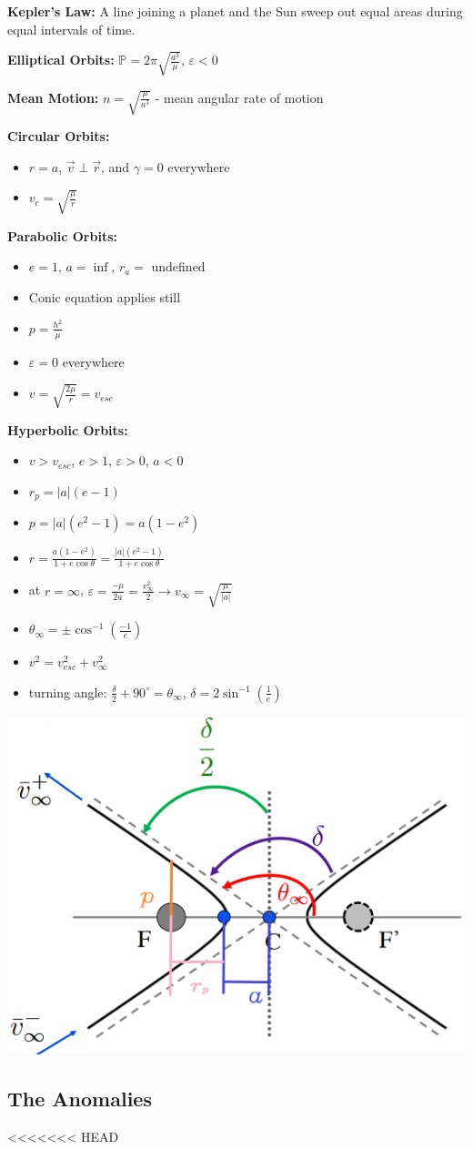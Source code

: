 \documentclass{article}
\begin{document}
\begin{multicols*}{3}
    \textbf{Kepler's Law:} A line joining a planet and the Sun sweep out equal areas during equal intervals of time.\par 
    \textbf{Elliptical Orbits:} $\mathbb{P}=2\pi\sqrt{\frac{a^3}{\mu}}$, $\varepsilon<0$\par
    \textbf{Mean Motion:} $n=\sqrt{\frac{\mu}{a^3}}$ - mean angular rate of motion\par 
    \textbf{Circular Orbits:}
    \begin{itemize}
        \itemsep0em
        \item $r = a$, $\vec{v} \perp \vec{r}$, and $\gamma = 0$ everywhere
        \item $v_c=\sqrt{\frac{\mu}{r}}$
    \end{itemize}
    \textbf{Parabolic Orbits:}
    \begin{itemize}
        \itemsep0em
        \item $e=1$, $a=\inf$, $r_a=$ undefined
        \item Conic equation applies still
        \item $p = \frac{h^2}{\mu}$
        \item $\varepsilon=0$ everywhere
        \item $v = \sqrt{\frac{2\mu}{r}}=v_{esc}$
    \end{itemize}
    \textbf{Hyperbolic Orbits:}
    \begin{itemize}
        \itemsep0em
        \item $v>v_{esc}$, $e>1$, $\varepsilon>0$, $a<0$
        \item $r_p=|a|(e-1)$
        \item $p=|a|(e^2-1)=a(1-e^2)$
        \item $r=\frac{a(1-e^2)}{1+e\cos{\theta}}=\frac{|a|(e^2-1)}{1+e\cos{\theta}}$
        \item at $r = \infty$, $\varepsilon = \frac{-\mu}{2a}=\frac{v^2_{\infty}}{2}\rightarrow v_{\infty}=\sqrt{\frac{\mu}{|a|}}$
        \item $\theta_{\infty} = \pm\cos^{-1}\left({\frac{-1}{e}}\right)$
        \item $v^2=v^2_{esc}+v^2_{\infty}$
        \item turning angle: $\frac{\delta}{2}+90^\circ=\theta_\infty$, $\delta = 2\sin^{-1}({\frac{1}{e}})$
    \end{itemize}
    \includegraphics[width=0.5\linewidth]{Figures/hyperbolic_orbit.png}
    \subsection*{The Anomalies}
<<<<<<< HEAD


\end{multicols*}  
\end{document}
